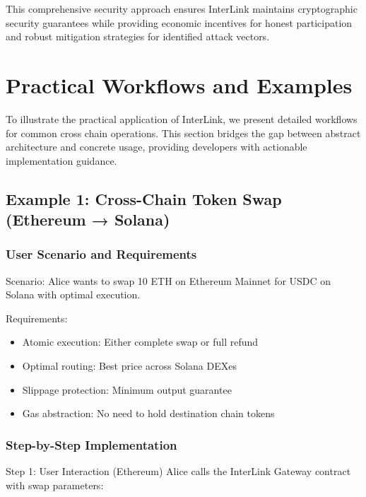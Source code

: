 \documentclass[11pt,a4paper]{article}
\begin{document}
This comprehensive security approach ensures InterLink maintains cryptographic security guarantees while providing economic incentives for honest participation and robust mitigation strategies for identified attack vectors.

\section{Practical Workflows and Examples}
\label{sec:workflows}

To illustrate the practical application of InterLink, we present detailed workflows for common cross chain operations. This section bridges the gap between abstract architecture and concrete usage, providing developers with actionable implementation guidance.

\subsection{Example 1: Cross-Chain Token Swap (Ethereum → Solana)}

\subsubsection{User Scenario and Requirements}
Scenario: Alice wants to swap 10 ETH on Ethereum Mainnet for USDC on Solana with optimal execution.

Requirements:
\begin{itemize}
    \item Atomic execution: Either complete swap or full refund
    \item Optimal routing: Best price across Solana DEXes
    \item Slippage protection: Minimum output guarantee
    \item Gas abstraction: No need to hold destination chain tokens
\end{itemize}

\subsubsection{Step-by-Step Implementation}

Step 1: User Interaction (Ethereum)
Alice calls the InterLink Gateway contract with swap parameters:
\end{document}

